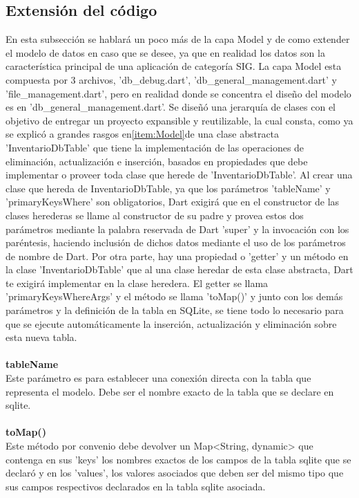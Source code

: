 \subsection{Extensión del código}
En esta subsección se hablará un poco más de la capa Model y de como extender el modelo de datos en caso que se desee, ya que en realidad los datos son la característica principal de una aplicación de categoría SIG.
La capa Model esta compuesta por 3 archivos, 'db\_debug.dart', 'db\_general\_management.dart' y 'file\_management.dart', pero en realidad donde se concentra el diseño del modelo es en 'db\_general\_management.dart'. Se diseñó una jerarquía de clases con el objetivo de
entregar un proyecto expansible y reutilizable, la cual consta, como ya se explicó a grandes rasgos en\ref{item:Model}de una clase abstracta 'InventarioDbTable' que tiene la implementación de las operaciones de eliminación, actualización e inserción, basados en propiedades que debe
implementar o proveer toda clase que herede de 'InventarioDbTable'. Al crear una clase que hereda de InventarioDbTable, ya que los parámetros 'tableName' y 'primaryKeysWhere' son obligatorios, Dart exigirá que en el constructor de las clases herederas se llame al constructor de su padre
y provea estos dos parámetros mediante la palabra reservada de Dart 'super' y la invocación con los paréntesis, haciendo inclusión de dichos datos mediante el uso de los parámetros de nombre de Dart. Por otra parte, hay una propiedad o 'getter' y un método en la clase 'InventarioDbTable' que al
una clase heredar de esta clase abstracta, Dart te exigirá implementar en la clase heredera. El getter se llama 'primaryKeysWhereArgs' y el método se llama 'toMap()' y junto con los demás parámetros y la definición de la tabla en SQLite, se tiene todo lo necesario para que se ejecute automáticamente la inserción, actualización y eliminación sobre esta nueva tabla.
\\\\
\textbf{tableName}\\
Este parámetro es para establecer una conexión directa con la tabla que representa el modelo. Debe ser el nombre exacto de la tabla que se declare en sqlite.
\\\\
\textbf{toMap()}\\
Este método por convenio debe devolver un Map<String, dynamic> que contenga en sus 'keys' los nombres exactos de los campos de la tabla sqlite que se declaró y en los 'values', los valores asociados que deben ser del mismo tipo que sus campos respectivos declarados en la tabla sqlite asociada.

